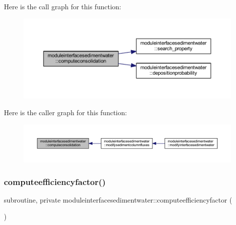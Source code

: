 Here is the call graph for this function\+:\nopagebreak
\begin{figure}[H]
\begin{center}
\leavevmode
\includegraphics[width=350pt]{namespacemoduleinterfacesedimentwater_a488a986c36aca3233969de75a2e2094e_cgraph}
\end{center}
\end{figure}
Here is the caller graph for this function\+:\nopagebreak
\begin{figure}[H]
\begin{center}
\leavevmode
\includegraphics[width=350pt]{namespacemoduleinterfacesedimentwater_a488a986c36aca3233969de75a2e2094e_icgraph}
\end{center}
\end{figure}
\mbox{\label{namespacemoduleinterfacesedimentwater_a0e6b11bab2cf3a9864f9e36970079830}} 
\subsubsection{\texorpdfstring{computeefficiencyfactor()}{computeefficiencyfactor()}}
{\footnotesize\ttfamily subroutine, private moduleinterfacesedimentwater\+::computeefficiencyfactor (\begin{DoxyParamCaption}{ }\end{DoxyParamCaption})\hspace{0.3cm}{\ttfamily [private]}}

